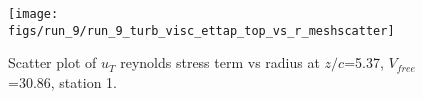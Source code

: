 \begin{figure}[H]
\centering
\texttt{[image: figs/run\_9/run\_9\_turb\_visc\_ettap\_top\_vs\_r\_meshscatter]}
\caption{Scatter plot of $
u_T$ reynolds stress term vs radius at $z/c$=5.37, $V_{free}$=30.86, station 1.}
\label{fig:run_9_turb_visc_ettap_top_vs_r_meshscatter}
\end{figure}


